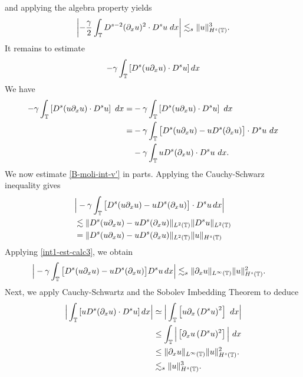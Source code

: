 and applying the algebra property yields
\begin{equation}
\label{hl2-prime}
\left | -\frac{\gamma}{2} \int_{\mathbb{T}} D^{s-2} (\partial_x u)^2 \cdot
D^s u \; dx \right |
\lesssim_{s}  \|u\|_{H^s(\mathbb{T})}^3.
\end{equation}
It remains to estimate 
\begin{equation*}
- \gamma \int_{\mathbb{T}} \left [  D^s (u \partial_x u) \cdot
D^s u \right ]  dx
\end{equation*}
We have
\begin{equation} 
\begin{split}
\label{B-moli-int-v'}
-  \gamma \int_{\mathbb{T}} \left [D^s (u \partial_x u) \cdot D^s
u \right ] \ dx
= &- \gamma  \int_{\mathbb{T}}
\left [ D^s(u \partial_x u) \cdot   D^s u \right ] \ dx
\\
=& - \gamma \int_{\mathbb{T}}
\big[ 
D^s(u\partial_x u)  -  u D^s (\partial_xu)
\big] \cdot
D^s u   \ dx
\\
&
- \gamma \int_{\mathbb{T}}
u D^s (\partial_xu) \cdot
D^su \ dx.
\end{split}
\end{equation}
%
%
%
We now estimate \eqref{B-moli-int-v'} in parts. Applying the Cauchy-Schwarz inequality gives
%
\begin{equation*} 
\begin{split}
& \Big|
- \gamma \int_{\mathbb{T}}
\big[ 
D^s(u\partial_x u)  -  u D^s (\partial_xu)
\big] \cdot
D^s u   \, dx
\Big|
\\
& \lesssim
 \|
D^s(u\partial_x u)  -  u D^s (\partial_xu)
\|_{L^2(\mathbb{T})}
\|
D^s u 
\|_{L^2(\mathbb{T})}
\\
& =
 \| D^s(u\partial_x u)  -  u D^s (\partial_xu)
\|_{L^2(\mathbb{T})}
\|
u
\|_{H^s(\mathbb{T})}
\end{split}
\end{equation*}
Applying \eqref{int1-est-calc3}, we obtain
\begin{equation*}
\begin{split}
\Big|
- \gamma \int_{\mathbb{T}}
\big[ 
D^s(u\partial_x u)  -  u D^s (\partial_xu)
\big]
D^s u   \, dx
\Big|
&\lesssim_{s}
\| \partial_x u \|_{L^\infty(\mathbb{T})} 
\| u \|_{H^s(\mathbb{T})}^2.
\end{split}
\end{equation*}
%
Next, we apply Cauchy-Schwartz and the Sobolev Imbedding Theorem to deduce 
%
%
%
\begin{equation} 
\label{int1-est-calc5'}
\begin{split}
\Big|
\int_{\mathbb{T}}
\left [u D^s (\partial_x u)
\cdot  D^s u \right ] dx
\Big|
& \simeq 
 \Big|
\int_{\mathbb{T}}
\left [u \partial_x\left(D^s u\right)^2 \right ] \ dx
\Big|
\\
& \le
 \int_{\mathbb{T}} \Big |
\left [\partial_x u \, (D^s u)^2  \right ] 
\Big| \ dx
\\
& \le
\| \partial_x u \|_{L^\infty(\mathbb{T})} 
\| u \|_{H^s(\mathbb{T})}^2.
\\
& \lesssim_{s}  \|u\|_{H^s(\mathbb{T})}^3.
\end{split}
\end{equation}

